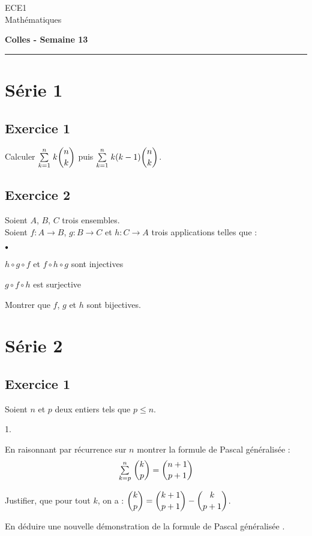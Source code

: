 \documentclass[11pt]{article}%
\begin{document}
\begin{flushleft}
ECE1 \\
Mathématiques
\end{flushleft}

\begin{center}
\textbf{\Large{Colles - Semaine 13}}
\end{center}

\hrule

\vspace*{0,2cm}

\section{Série 1}

\subsection*{Exercice 1}
\noindent
Calculer ${\textstyle\sum\limits_{k=1}^{n}}\hspace{.1cm} k \dbinom{n}{k}$ puis ${\textstyle\sum\limits_{k=1}^{n}}\hspace{.1cm} 
k(k-1) \dbinom{n}{k}$.


\subsection*{Exercice 2}
\noindent
Soient $A$, $B$, $C$ trois ensembles.\\
  Soient $f : A \to B$, $g : B \to C$ et $h : C \to A$ trois
  applications telles que :
  \begin{liste}{$\scriptstyle \bullet$}
  \item $h \circ g \circ f$ et $f \circ h \circ g$ sont injectives
  \item $g \circ f \circ h$ est surjective
  \end{liste}
  Montrer que $f$, $g$ et $h$ sont bijectives.



\section{Série 2}

\subsection*{Exercice 1}
\noindent
Soient $n$ et $p$ deux entiers tels que $p \leq n$.
  \begin{noliste}{1.}
  \item En raisonnant par récurrence sur $n$ montrer la formule de \og
    Pascal généralisée \fg{} :
    \[
     {\textstyle\sum\limits_{k=p}^{n}}\hspace{.1cm} \dbinom{k}{p} = \dbinom{n+1}{p+1}
    \]
  \item Justifier, que pour tout $k$, on a : $\dbinom{k}{p} =
    \dbinom{k+1}{p+1} - \dbinom{k}{p+1}$.
  \item En déduire une nouvelle démonstration de la formule de \og
    Pascal généralisée \fg{}.
  \end{noliste}
\end{document}
